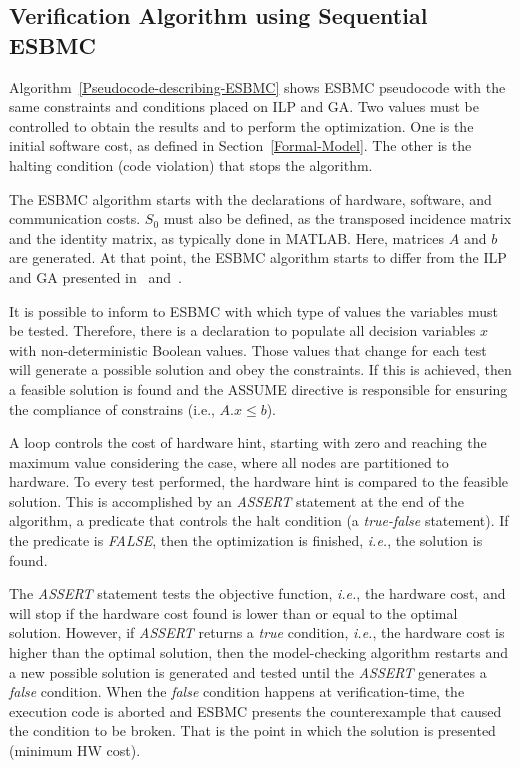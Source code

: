 \subsection{Verification Algorithm using Sequential ESBMC}
\label{Verification-Algorithm-using-ESBMC}

Algorithm~\ref{Pseudocode-describing-ESBMC} shows ESBMC pseudocode with the same constraints and conditions placed on ILP and GA. Two values must be controlled to obtain the results and to perform the optimization. One is the initial software cost, as defined in Section~\ref{Formal-Model}. The other is the halting condition (code violation) that stops the algorithm.

The ESBMC algorithm starts with the declarations of hardware, software, and communication costs. $S_0$ must also be defined, as the transposed incidence matrix and the identity matrix, as typically done in MATLAB. Here, matrices $A$ and $b$ are generated. At that point, the ESBMC algorithm starts to differ from the ILP and GA presented in~\cite{Trindade2015} and~\cite{Trindade2014}.

It is possible to inform to ESBMC with which type of values the variables must be tested. Therefore, there is a declaration to populate all decision variables $x$ with non-deterministic Boolean values. Those values that change for each test will generate a possible solution and obey the constraints. If this is achieved, then a feasible solution is found and the ASSUME directive is responsible for ensuring the compliance of constrains (i.e., $A.x \leq b$).

A loop controls the cost of hardware hint, starting with zero and reaching the maximum value considering the case, where all nodes are partitioned to hardware. To every test performed, the hardware hint is compared to the feasible solution. This is accomplished by an \textit{ASSERT} statement at the end of the algorithm, a predicate that controls the halt condition (a \textit{true-false} statement). If the predicate is \textit{FALSE}, then the optimization is finished, {\it i.e.}, the solution is found. 

The \textit{ASSERT} statement tests the objective function, {\it i.e.}, the hardware cost, and will stop if the hardware cost found is lower than or equal to the optimal solution. However, if \textit{ASSERT} returns a \textit{true} condition, {\it i.e.}, the hardware cost is higher than the optimal solution, then the model-checking algorithm restarts and a new possible solution is generated and tested until the \textit{ASSERT} generates a \textit{false} condition. When the \textit{false} condition happens at verification-time, the execution code is aborted and ESBMC presents the counterexample that caused the condition to be broken. That is the point in which the solution is presented (minimum HW cost).


